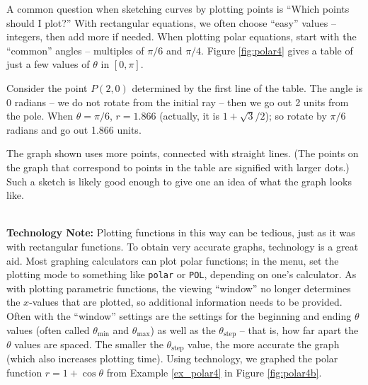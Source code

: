 {A common question when sketching curves by plotting points is ``Which points should I plot?'' With rectangular equations, we often choose ``easy'' values -- integers, then add more if needed. When plotting polar equations, start with the ``common'' angles -- multiples of $\pi/6$ and $\pi/4$. Figure \ref{fig:polar4} gives a table of just a few values of $\theta$ in $[0,\pi]$. 

Consider the point $P(2,0)$ determined by the first line of the table. The angle is 0 radians -- we do not rotate from the initial ray -- then we go out 2 units from the pole. When $\theta=\pi/6$, $r = 1.866$ (actually, it is $1+\sqrt{3}/2$); so rotate by $\pi/6$ radians and go out 1.866 units. 

The graph shown uses more points, connected with straight lines. (The points on the graph that correspond to points in the table are signified with larger dots.) Such a sketch is likely good enough to give one an idea of what the graph looks like.
}\\

\noindent\textbf{Technology Note:} Plotting functions in this way can be tedious, just as it was with rectangular functions. To obtain very accurate graphs, technology is a great aid. Most graphing calculators can plot polar functions; in the menu, set the plotting mode to something like \texttt{polar} or \texttt{POL}, depending on one's calculator. As with plotting parametric functions, the viewing ``window'' no longer determines the $x$-values that are plotted, so additional information needs to be provided. Often with the ``window'' settings are the settings for  the beginning and ending $\theta$ values (often called \texttt{$\theta_{\text{min}}$} and \texttt{$\theta_{\text{max}}$}) as well as the \texttt{$\theta_{\text{step}}$} -- that is, how far apart the $\theta$ values are spaced. The smaller the \texttt{$\theta_{\text{step}}$} value, the more accurate the graph (which also increases plotting time). Using technology, we graphed the polar function $r=1+\cos \theta$ from Example \ref{ex_polar4} in Figure \ref{fig:polar4b}.
\\

